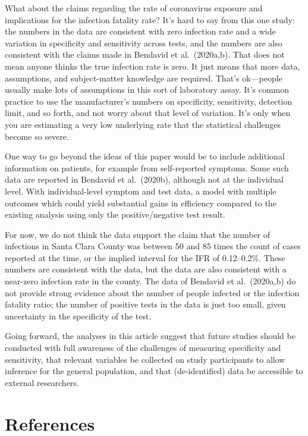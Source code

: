 \documentclass[11pt]{article}
\begin{document}
What about the claims regarding the rate of coronavirus exposure and implications for the infection fatality rate?  It's hard to say from this one study:  the numbers in the data are consistent with zero infection rate and a wide variation in specificity and sensitivity across tests, and the numbers are also consistent with the claims made in Bendavid et al.\ (2020a,b). That does not mean anyone thinks the true infection rate is zero.  It just means that more data, assumptions, and subject-matter knowledge are required. That's ok---people usually make lots of assumptions in this sort of laboratory assay. It's common practice to use the manufacturer's numbers on specificity, sensitivity, detection limit, and so forth, and not worry about that level of variation. It's only when you are estimating a very low underlying rate that the statistical challenges become so severe.

One way to go beyond the ideas of this paper would be to include additional information on patients, for example from self-reported symptoms.  Some such data are reported in Bendavid et al.\ (2020b), although not at the individual level. With individual-level symptom and test data, a model with multiple outcomes which could yield substantial gains in efficiency compared to the existing analysis using only the positive/negative test result.

For now, we do not think the data support the claim that the number of infections in Santa Clara County was between  50 and 85 times the count of cases reported at the time, or the implied interval for the IFR of 0.12--0.2\%.  These numbers are consistent with the data, but the data are also consistent with a near-zero infection rate in the county.  The data of Bendavid et al.\ (2020a,b) do not provide strong evidence about the number of people infected or the infection fatality ratio; the number of positive tests in the data is just too small, given uncertainty in the specificity of the test.

Going forward, the analyses in this article suggest that future studies should be conducted with full awareness of the challenges of measuring specificity and sensitivity, that relevant variables be collected on study participants to allow inference for the general population, and that (de-identified) data be accessible to external researchers.


\section*{References}
\end{document}
